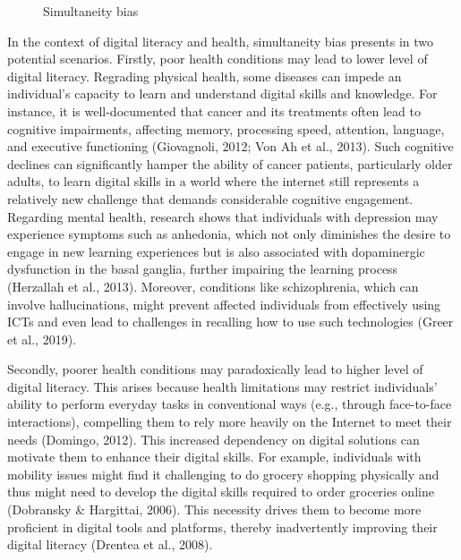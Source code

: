 \begin{figure}[h!]
    \centering
    \caption{Simultaneity bias}
    \label{fig:sb}
\end{figure}

In the context of digital literacy and health, simultaneity bias presents in two potential scenarios. Firstly, poor health conditions may lead to lower level of digital literacy. Regrading physical health, some diseases can impede an individual's capacity to learn and understand digital skills and knowledge. For instance, it is well-documented that cancer and its treatments often lead to cognitive impairments, affecting memory, processing speed, attention, language, and executive functioning (Giovagnoli, 2012; Von Ah et al., 2013). Such cognitive declines can significantly hamper the ability of cancer patients, particularly older adults, to learn digital skills in a world where the internet still represents a relatively new challenge that demands considerable cognitive engagement. Regarding mental health, research shows that individuals with depression may experience symptoms such as anhedonia, which not only diminishes the desire to engage in new learning experiences but is also associated with dopaminergic dysfunction in the basal ganglia, further impairing the learning process (Herzallah et al., 2013). Moreover, conditions like schizophrenia, which can involve hallucinations, might prevent affected individuals from effectively using ICTs and even lead to challenges in recalling how to use such technologies (Greer et al., 2019).

Secondly, poorer health conditions may paradoxically lead to higher level of digital literacy. This arises because health limitations may restrict individuals' ability to perform everyday tasks in conventional ways (e.g., through face-to-face interactions), compelling them to rely more heavily on the Internet to meet their needs (Domingo, 2012). This increased dependency on digital solutions can motivate them to enhance their digital skills. For example, individuals with mobility issues might find it challenging to do grocery shopping physically and thus might need to develop the digital skills required to order groceries online (Dobransky \& Hargittai, 2006). This necessity drives them to become more proficient in digital tools and platforms, thereby inadvertently improving their digital literacy (Drentea et al., 2008). 

